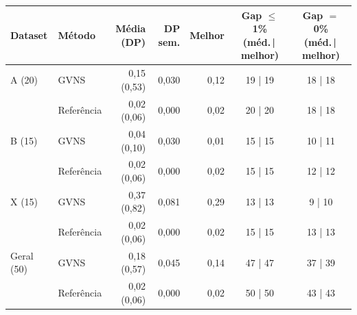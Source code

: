 \small
\begin{tabular}{llrrrcc}
\toprule
Dataset & Método & Média (DP) & DP sem. & Melhor & Gap $\leq$ 1\% (méd.\,|\,melhor) & Gap $=$ 0\% (méd.\,|\,melhor) \\
\midrule
A (20) & GVNS & 0,15 (0,53) & 0,030 & 0,12 & 19 | 19 & 18 | 18 \\
 & Referência & 0,02 (0,06) & 0,000 & 0,02 & 20 | 20 & 18 | 18 \\
B (15) & GVNS & 0,04 (0,10) & 0,030 & 0,01 & 15 | 15 & 10 | 11 \\
 & Referência & 0,02 (0,06) & 0,000 & 0,02 & 15 | 15 & 12 | 12 \\
X (15) & GVNS & 0,37 (0,82) & 0,081 & 0,29 & 13 | 13 & 9 | 10 \\
 & Referência & 0,02 (0,06) & 0,000 & 0,02 & 15 | 15 & 13 | 13 \\
Geral (50) & GVNS & 0,18 (0,57) & 0,045 & 0,14 & 47 | 47 & 37 | 39 \\
 & Referência & 0,02 (0,06) & 0,000 & 0,02 & 50 | 50 & 43 | 43 \\
\bottomrule
\end{tabular}

